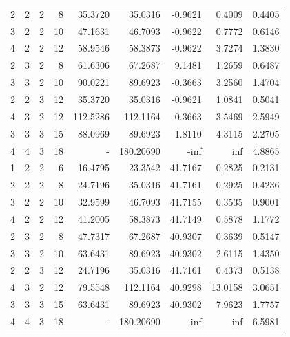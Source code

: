 \documentclass{article}
\begin{document}
\begin{center}
{\begin{tabular}{rrrrrrrrr}
2 & 2 & 2 & 8 & 35.3720 & 35.0316 & -0.9621 & 0.4009 & 0.4405 \\
3 & 2 & 2 & 10 & 47.1631 & 46.7093 & -0.9622 & 0.7772 & 0.6146 \\
4 & 2 & 2 & 12 & 58.9546 & 58.3873 & -0.9622 & 3.7274 & 1.3830 \\
2 & 3 & 2 & 8 & 61.6306 & 67.2687 & 9.1481 & 1.2659 & 0.6487 \\
3 & 3 & 2 & 10 & 90.0221 & 89.6923 & -0.3663 & 3.2560 & 1.4704 \\
2 & 2 & 3 & 12 & 35.3720 & 35.0316 & -0.9621 & 1.0841 & 0.5041 \\
4 & 3 & 2 & 12 & 112.5286 & 112.1164 & -0.3663 & 3.5469 & 2.5949 \\
3 & 3 & 3 & 15 & 88.0969 & 89.6923 & 1.8110 & 4.3115 & 2.2705 \\
4 & 4 & 3 & 18 & -      & 180.20690 & -inf & inf & 4.8865 \\\hline
1 & 2 & 2 & 6 & 16.4795 & 23.3542 & 41.7167 & 0.2825 & 0.2131 \\
2 & 2 & 2 & 8 & 24.7196 & 35.0316 & 41.7161 & 0.2925 & 0.4236 \\
3 & 2 & 2 & 10 & 32.9599 & 46.7093 & 41.7155 & 0.3535 & 0.9001 \\
4 & 2 & 2 & 12 & 41.2005 & 58.3873 & 41.7149 & 0.5878 & 1.1772 \\
2 & 3 & 2 & 8 & 47.7317 & 67.2687 & 40.9307 & 0.3639 & 0.5147 \\
3 & 3 & 2 & 10 & 63.6431 & 89.6923 & 40.9302 & 2.6115 & 1.4350 \\
2 & 2 & 3 & 12 & 24.7196 & 35.0316 & 41.7161 & 0.4373 & 0.5138 \\
4 & 3 & 2 & 12 & 79.5548 & 112.1164 & 40.9298 & 13.0158 & 3.0651 \\
3 & 3 & 3 & 15 & 63.6431 & 89.6923 & 40.9302 & 7.9623 & 1.7757 \\
4 & 4 & 3 & 18 & -      & 180.20690 & -inf & inf & 6.5981 \\\hline
\bottomrule
\end{tabular}%
}
\end{center}
\end{document}
